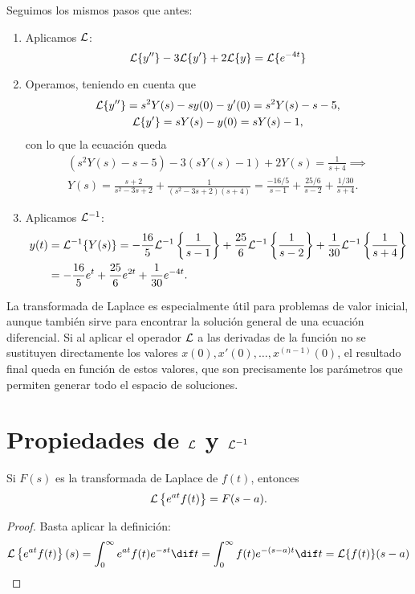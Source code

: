 \documentclass[../ecuaciones_diferenciales.tex]{subfiles}
\begin{document}
\begin{solution}
	Seguimos los mismos pasos que antes:
	\begin{enumerate}[1)]
		\item Aplicamos \(\mathcal{L}\):
		      \[\mathcal{L}\{y''\} - 3\mathcal{L}\{y'\} + 2\mathcal{L}\{y\} = \mathcal{L}\{e^{-4t}\}\]
		\item Operamos, teniendo en cuenta que
		      \begin{gather*}
			      \mathcal{L}\{y''\} = s^2Y(s) - sy(0) - y'(0) = s^2Y(s) - s - 5, \\
			      \mathcal{L}\{y'\} = sY(s) - y(0) = sY(s) - 1,
		      \end{gather*}
		      con lo que la ecuación queda
		      \begin{gather*}
			      \left(s^2Y(s) - s - 5\right) - 3\left(sY(s) - 1\right) + 2Y(s) =
			      \frac{1}{s+4} \implies \\
			      Y(s) = \frac{s+2}{s^2-3s+2} + \frac{1}{(s^2-3s+2)(s+4)} =
			      \frac{-16/5}{s-1} + \frac{25/6}{s-2} + \frac{1/30}{s+4}.
		      \end{gather*}
		\item Aplicamos \(\mathcal{L}^{-1}\):
		      \begin{align*}
			      y(t) & = \mathcal{L}^{-1}\{Y(s)\}
			      = -\frac{16}{5}\mathcal{L}^{-1}\left\{\frac{1}{s-1}\right\}
			      + \frac{25}{6}\mathcal{L}^{-1}\left\{\frac{1}{s-2}\right\}
			      + \frac{1}{30}\mathcal{L}^{-1}\left\{\frac{1}{s+4}\right\} \\
			           & = -\frac{16}{5}e^t + \frac{25}{6}e^{2t}
			      + \frac{1}{30}e^{-4t}.
		      \end{align*}
	\end{enumerate}
\end{solution}

\begin{remark}
	La transformada de Laplace es especialmente útil para problemas de valor
	inicial, aunque también sirve para encontrar la solución general de una
	ecuación diferencial. Si al aplicar el operador \(\mathcal{L}\) a las derivadas de la
	función no se sustituyen directamente los valores
	\(x(0), x'(0), \dots, x^{(n-1)}(0)\), el resultado final queda en función de
	estos valores, que son precisamente los parámetros que permiten generar todo
	el espacio de soluciones.
\end{remark}

\section{Propiedades de \(\mathcal{L}\) y \(\mathcal{L}^{-1}\)}
\begin{proposition}
	Si \(F(s)\) es la transformada de Laplace de \(f(t)\), entonces
	\[\mathcal{L}\left\{e^{at}f(t)\right\} = F(s-a).\]
	\begin{proof}
		Basta aplicar la definición:
		\[\L\left\{e^{at}f(t)\right\}(s) = \int_0^\infty e^{at}f(t) e^{-st} \dif t
			= \int_0^\infty f(t) e^{-(s-a)t} \dif t = \L\{f(t)\}(s-a)\]
	\end{proof}
\end{proposition}
\end{document}
